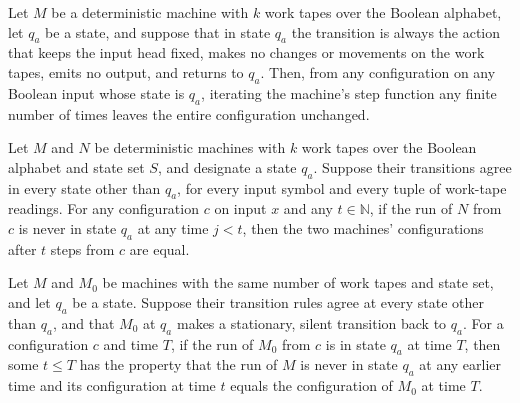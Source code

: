 \begin{lemma}
\label{Complexity.enumCont_absorb}
\leanok
{}
Let $M$ be a deterministic machine with $k$ work tapes over the Boolean alphabet, let
$q_a$ be a state, and suppose that in state $q_a$ the transition is always the action
that keeps the input head fixed, makes no changes or movements on the work tapes, emits
no output, and returns to $q_a$. Then, from any configuration on any Boolean input whose
state is $q_a$, iterating the machine's step function any finite number of times leaves
the entire configuration unchanged.
\end{lemma}

\begin{lemma}
\label{Complexity.enumCont_agree_run}
\leanok
{}
Let $M$ and $N$ be deterministic machines with $k$ work tapes over the Boolean alphabet
and state set $S$, and designate a state $q_a$. Suppose their transitions agree in every
state other than $q_a$, for every input symbol and every tuple of work-tape readings.
For any configuration $c$ on input $x$ and any $t\in\mathbb N$, if the run of $N$ from
$c$ is never in state $q_a$ at any time $j<t$, then the two machines' configurations
after $t$ steps from $c$ are equal.
\end{lemma}

\begin{lemma}
\label{Complexity.enumCont_first_anchor}
\leanok
{}
Let $M$ and $M_0$ be machines with the same number of work tapes and state set, and let
$q_a$ be a state. Suppose their transition rules agree at every state other than $q_a$,
and that $M_0$ at $q_a$ makes a stationary, silent transition back to $q_a$. For a
configuration $c$ and time $T$, if the run of $M_0$ from $c$ is in state $q_a$ at time
$T$, then some $t\le T$ has the property that the run of $M$ is never in state $q_a$ at
any earlier time and its configuration at time $t$ equals the configuration of $M_0$ at
time $T$.
\end{lemma}

